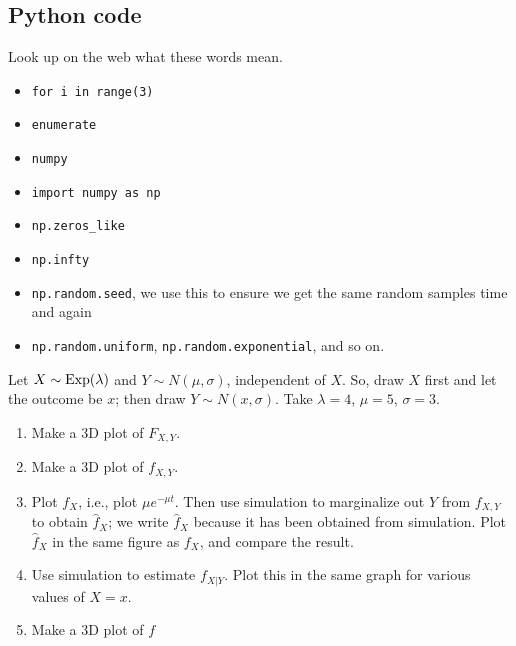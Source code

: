 \documentclass[a4paper]{article}
\begin{document}
\subsection{Python code}
\label{sec:org8074bd4}
Look up on the web what  these words mean. 
\begin{itemize}
\item \texttt{for i in range(3)}
\item \texttt{enumerate}
\item \texttt{numpy}
\item \texttt{import numpy as np}
\item \texttt{np.zeros\_like}
\item \texttt{np.infty}
\item \texttt{np.random.seed}, we  use this to ensure we get the same random samples time and again
\item \texttt{np.random.uniform}, \texttt{np.random.exponential}, and so on.
\end{itemize}


\begin{exercise}
Let $X\sim\mathrm{Exp}(\lambda)$ and $Y \sim N(\mu, \sigma)$, independent of $X$.
So, draw $X$ first and let the outcome be $x$; then draw $Y\sim N(x, \sigma)$.
Take $\lambda=4$, $\mu = 5$, $\sigma=3$.
\begin{enumerate}
\item Make a 3D plot of $F_{X,Y}$.
\item Make a 3D plot of $f_{X,Y}$.
\item Plot $f_{X}$, i.e., plot $\mu e^{-\mu t}$.
  Then use simulation to marginalize out $Y$ from $f_{X,Y}$ to obtain $\hat f_X$; we write $\hat f_X$ because it has been obtained from simulation.
  Plot $\hat f_X$ in the same figure as $f_X$, and compare the result.
\item Use simulation to estimate $f_{X|Y}$. Plot this in the same graph for various values of $X=x$. 
\item Make a 3D plot of $f$
\end{enumerate}
\end{exercise}
\end{document}
